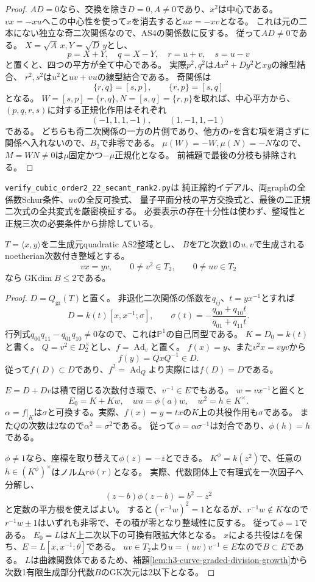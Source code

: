 \begin{proof}
$AD=0$なら、交換を除き$D=0,A\ne0$であり、$x^2$は中心である。
$vx=-xu$へこの中心性を使って$x$を消去すると$ux=-xv$となる。
これは元の二本にない独立な奇二次関係なので、AS4の関係数に反する。
従って$AD\ne0$である。
$X=\sqrt A\,x,Y=\sqrt D\,y$とし、
\[
 p=X+Y,\quad q=X-Y,\quad r=u+v,\quad s=u-v
\]
と置くと、四つの平方が全て中心である。
実際$p^2,q^2$は$Ax^2+Dy^2$と$xy$の線型結合、
$r^2,s^2$は$u^2$と$uv+vu$の線型結合である。
奇関係は
\[
 \{r,q\}=[s,p],\qquad \{r,p\}=[s,q]
\]
となる。
$W=[s,p]=\{r,q\},N=[s,q]=\{r,p\}$を取れば、中心平方から、
$(p,q,r,s)$に対する正規化作用はそれぞれ
\[
 (-1,1,1,-1),\qquad (1,-1,1,-1)
\]
である。
どちらも奇二次関係の一方の片側であり、他方の$r$を含む項を消さずに関係へ入れないので、$B_2$で非零である。
$\mu(W)=-W,\mu(N)=-N$なので、$M=WN\ne0$は$\mu$固定かつ$-\mu$正規化となる。
前補題で最後の分枝も排除される。
\end{proof}

\texttt{verify\_cubic\_order2\_22\_secant\_rank2.py}は
純正縮約イデアル、両graphの全係数Schur条件、$uv$の全反可換式、
量子平面分枝の平方交換式と、最後の二正規二次式の全共変式を厳密検証する。
必要表示の存在十分性は使わず、整域性と正規三次の必要条件から排除している。

\begin{lemma}[AS2平面上の部分正規化平方根の成長障害]
\label{lem:h3-AS2-partial-root-growth}
$T=\langle x,y\rangle$を二生成元quadratic AS2整域とし、
$B$を$T$と次数1の$u,v$で生成されるnoetherian次数付き整域とする。
\[
 vx=yv,\qquad 0\ne v^2\in T_2,\qquad 0\ne uv\in T_2
\]
なら$\operatorname{GKdim}B\le2$である。
\end{lemma}
\begin{proof}
$D=Q_{\mathrm{gr}}(T)$と置く。
非退化二次関係の係数を$q_{ij}$、$t=yx^{-1}$とすれば
\[
 D=k(t)[x,x^{-1};\sigma],\qquad
 \sigma(t)=-\frac{q_{00}+q_{10}t}{q_{01}+q_{11}t}.
\]
行列式$q_{00}q_{11}-q_{01}q_{10}\ne0$なので、これは$\mathbb P^1$の自己同型である。
$K=D_0=k(t)$と書く。
$Q=v^2\in D_2^\times$とし、$f=\operatorname{Ad}_v$と置く。
$f(x)=y$、また$v^2x=vyv$から
\[
 f(y)=QxQ^{-1}\in D.
\]
従って$f(D)\subset D$であり、$f^2=\operatorname{Ad}_Q$より実際には$f(D)=D$である。

$E=D+Dv$は積で閉じる次数付き環で、$v^{-1}\in E$でもある。
$w=vx^{-1}$と置くと
\[
 E_0=K+Kw,\quad w a=\phi(a)w,\quad w^2=h\in K^\times.
\]
$\alpha=f|_K$は$\sigma$と可換する。実際、$f(x)=y=tx$の$K$上の共役作用も$\sigma$である。
また$Q$の次数は2なので$\alpha^2=\sigma^2$である。
従って$\phi=\alpha\sigma^{-1}$は対合であり、$\phi(h)=h$である。

$\phi\ne1$なら、座標を取り替えて$\phi(z)=-z$とできる。
$K^\phi=k(z^2)$で、任意の$h\in(K^\phi)^\times$はノルム$r\phi(r)$となる。
実際、代数閉体上で有理式を一次因子へ分解し、
\[
 (z-b)\phi(z-b)=b^2-z^2
\]
と定数の平方根を使えばよい。
すると$(r^{-1}w)^2=1$となるが、$r^{-1}w\notin K$なので
$r^{-1}w\pm1$はいずれも非零で、その積が零となり整域性に反する。
従って$\phi=1$である。
$E_0=L$は$K$上二次以下の可換有限拡大体となる。
$x$による共役は$L$を保ち、$E=L[x,x^{-1};\theta]$である。
$uv\in T_2$より$u=(uv)v^{-1}\in E$なので$B\subset E$である。
$L$は曲線関数体であるため、補題\ref{lem:h3-curve-graded-division-growth}から
次数1有限生成部分代数$B$のGK次元は2以下となる。
\end{proof}

